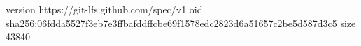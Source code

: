 version https://git-lfs.github.com/spec/v1
oid sha256:06fdda5527f3eb7e3ffbafddffcbe69f1578edc2823d6a51657c2be5d587d3c5
size 43840
